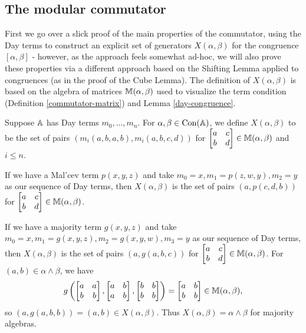 \documentclass[letterpaper,11pt]{article}
\DeclareMathOperator{\Con}{Con}
\begin{document}
\subsection{The modular commutator}

First we go over a slick proof of the main properties of the commutator, using the Day terms to construct an explicit set of generators $X(\alpha,\beta)$ for the congruence $[\alpha,\beta]$ - however, as the approach feels somewhat ad-hoc, we will also prove these properties via a different approach based on the Shifting Lemma applied to congruences (as in the proof of the Cube Lemma). The definition of $X(\alpha,\beta)$ is based on the algebra of matrices $\mathbb{M}(\alpha,\beta)$ used to visualize the term condition (Definition \ref{commutator-matrix}) and Lemma \ref{day-congruence}.

\begin{defn} Suppose $\mathbb{A}$ has Day terms $m_0, ..., m_n$. For $\alpha, \beta \in \Con(\bA)$, we define $X(\alpha,\beta)$ to be the set of pairs $(m_i(a,b,a,b),m_i(a,b,c,d))$ for $\begin{bmatrix} a & c\\ b & d\end{bmatrix} \in \mathbb{M}(\alpha,\beta)$ and $i \le n$.
\end{defn}

\begin{ex} If we have a Mal'cev term $p(x,y,z)$ and take $m_0 = x, m_1 = p(z,w,y), m_2 = y$ as our sequence of Day terms, then $X(\alpha,\beta)$ is the set of pairs $(a,p(c,d,b))$ for $\begin{bmatrix} a & c\\ b & d\end{bmatrix} \in \mathbb{M}(\alpha,\beta)$.
\end{ex}

\begin{ex} If we have a majority term $g(x,y,z)$ and take $m_0 = x, m_1 = g(x,y,z), m_2 = g(x,y,w), m_3 = y$ as our sequence of Day terms, then $X(\alpha,\beta)$ is the set of pairs $(a,g(a,b,c))$ for $\begin{bmatrix} a & c\\ b & d\end{bmatrix} \in \mathbb{M}(\alpha,\beta)$. For $(a,b) \in \alpha\wedge\beta$, we have
\[
g\left(\begin{bmatrix} a & a\\ b & b\end{bmatrix}, \begin{bmatrix} a & b\\ a & b\end{bmatrix}, \begin{bmatrix} b & b\\ b & b\end{bmatrix}\right) = \begin{bmatrix} a & b\\ b & b\end{bmatrix} \in \mathbb{M}(\alpha,\beta),
\]
so $(a,g(a,b,b)) = (a,b) \in X(\alpha,\beta)$. Thus $X(\alpha,\beta) = \alpha\wedge\beta$ for majority algebras.
\end{ex}
\end{document}
